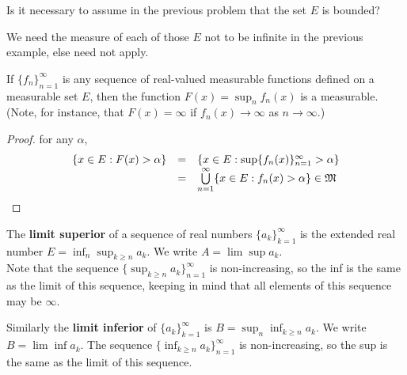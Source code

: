 \begin{pblm}%
	Is it necessary to assume in the previous problem that the set $E$ is 
	bounded? 

	We need the measure of each of those $E$ not to be infinite 
	in the previous example, else  need not apply. 
\end{pblm}

\begin{pblm}%
	If $\{f_n\}_{n=1}^\infty$ is any sequence of real-valued measurable 
	functions defined on a measurable set $E$, then the function 
	$F(x) = \sup_n f_n(x)$ is a measurable. (Note, for instance, that 
	$F(x) = \infty$ if $f_n(x) \rightarrow \infty$ as $n \rightarrow \infty$.)
\begin{proof}
	for any $\alpha$, 
	\begin{equation*}
	\begin{array}{rcl}
		\{x \in E: F(x) > \alpha\} &=& \{x \in E: \sup \{f_n(x)\}_{n=1}^\infty > \alpha\}\\
		&=& \bigcup\limits_{n=1}^\infty\{x\in E: f_n(x) > \alpha\} \in \mathfrak{M}
	\end{array}
	\end{equation*}
\end{proof}
\end{pblm}

\begin{defn}\label{d:limsup}%
	The \textbf{limit superior} of a sequence of real numbers 
	$\{a_k\}_{k=1}^\infty$ is the extended real number 
	$E = \inf_n \sup_{k\ge n} a_k$. We write $A = \lim\sup a_k$. \\
	Note that the sequence $\{\sup_{k\ge n}a_k\}_{n=1}^\infty$ is 
	non-increasing, so the inf is the same as the limit of this sequence, 
	keeping in mind that all elements of this sequence may be $\infty$. 

	Similarly the \textbf{limit inferior} of $\{a_k\}_{k=1}^\infty$ is 
	$B = \sup_n\inf_{k\ge n}a_k$. We write $B = \lim\inf a_k$. The sequence 
	$\{\inf_{k\ge n}a_k\}_{n=1}^\infty$ is non-increasing, so the sup is the 
	same as the limit of this sequence. 
\end{defn}

